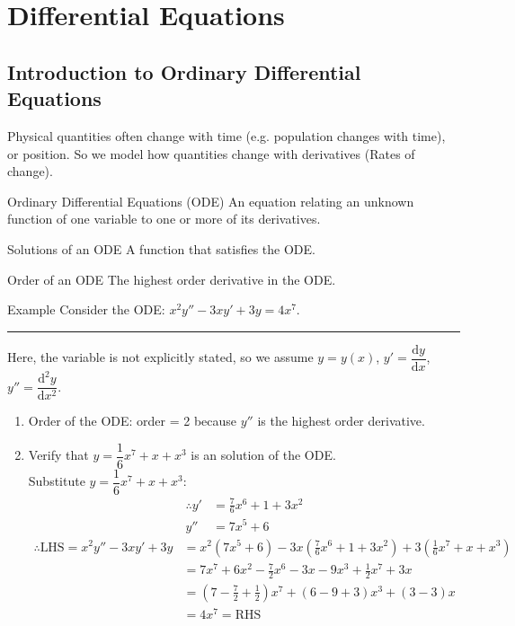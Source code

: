 \documentclass[12pt,a4paper]{article}
\def\d{{\mathrm{d}}}
\begin{document}
\newpage
\section{Differential Equations}
\subsection{Introduction to Ordinary Differential Equations}
Physical quantities often change with time (e.g. population changes with time), or position. So we model how quantities change with derivatives (Rates of change).
\begin{df}{Ordinary Differential Equations (ODE)}
	An equation relating an unknown function of one variable to one or more of its derivatives. 
\end{df}
\begin{df}{Solutions of an ODE}
	A function that satisfies the ODE.
\end{df}
\begin{df}{Order of an ODE}
	The highest order derivative in the ODE.
\end{df}
\begin{eg}{Example}
	Consider the ODE: $x^2y''-3xy'+3y=4x^7$.\\
	\noindent\rule[0.25\baselineskip]{\textwidth}{1pt}
	Here, the variable is not explicitly stated, so we assume $y=y(x)$, $y'=\dfrac{\d y}{\d x}$, $y''=\dfrac{\d^2 y}{\d x^2}$.
	\begin{enumerate}
		\item Order of the ODE: order = 2 because $y''$ is the highest order derivative. 
		\item Verify that $y=\dfrac{1}{6}x^7+x+x^3$ is an solution of the ODE.\\ 
		\newline Substitute $y=\dfrac{1}{6}x^7+x+x^3$: 
		$$\begin{aligned}
			\therefore y'&=\frac{7}{6}x^6+1+3x^2\\
			y''&=7x^5+6
		\end{aligned}$$
		$$\begin{aligned}
			\therefore \text{LHS}=x^2y''-3x y'+3y&=x^2(7x^5+6)-3x(\frac{7}{6}x^6+1+3x^2)+3(\frac{1}{6}x^7+x+x^3)\\
			&=7x^7+6x^2-\frac{7}{2}x^6-3x-9x^3+\frac{1}{2}x^7+3x\\
			&=\left(7-\frac{7}{2}+\frac{1}{2}\right)x^7+(6-9+3)x^3+(3-3)x\\
			&=4x^7=\text{RHS}
		\end{aligned}$$
	\end{enumerate}
\end{eg}
\end{document}

